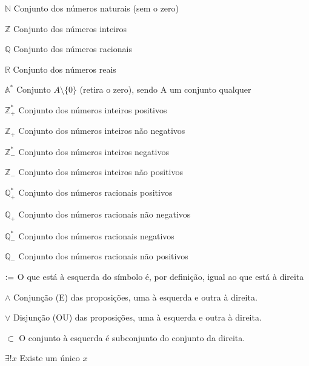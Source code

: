 \documentclass[../main.tex]{subfiles}
\begin{document}


\renewcommand\listadesimbolosname{{\fontsize{12pt}{\baselineskip}\normalfont \bfseries LISTA DE SÍMBOLOS}}
\begin{simbolos}
  \item[$ \mathbb{N} $] Conjunto dos números naturais (sem o zero)
  \item[$ \mathbb{Z} $] Conjunto dos números inteiros 
  \item[$ \mathbb{Q} $] Conjunto dos números racionais 
  \item[$ \mathbb{R} $] Conjunto dos números reais
  \item[$\mathbb{A^*}$] Conjunto $A \setminus \{0\}$ (retira o zero), sendo A um conjunto qualquer
  \item[$ \mathbb{Z}_+^{*} $] Conjunto dos números inteiros positivos
  \item[$ \mathbb{Z}_+$] Conjunto dos números inteiros não negativos
  \item[$ \mathbb{Z}_-^{*} $] Conjunto dos números inteiros negativos
  \item[$ \mathbb{Z}_-$] Conjunto dos números inteiros não positivos
  \item[$ \mathbb{Q}_+^{*} $] Conjunto dos números racionais positivos
  \item[$ \mathbb{Q}_+$] Conjunto dos números racionais não negativos
  \item[$ \mathbb{Q}_-^{*} $] Conjunto dos números racionais negativos
  \item[$ \mathbb{Q}_-$] Conjunto dos números racionais não positivos
  \item[$\vcentcolon=$] O que está à esquerda do símbolo é, por definição, igual ao que está à direita
  \item[$\land$] Conjunção (E) das proposições, uma à esquerda e outra à direita. 
  \item[$\lor$] Disjunção (OU) das proposições, uma à esquerda e outra à direita. 
  \item[$\subset$] O conjunto à esquerda é subconjunto do conjunto da direita. 
  \item[$\exists!x$] Existe um único $x$
\end{simbolos}



\end{document}
